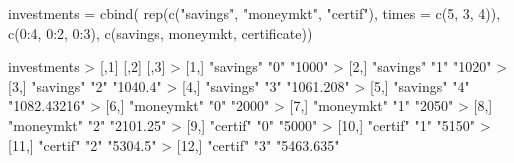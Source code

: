 \documentclass[
]{book}
\newenvironment{Shaded}{\begin{snugshade}}{\end{snugshade}}
\newcommand{\AttributeTok}[1]{\textcolor[rgb]{0.77,0.63,0.00}{#1}}
\newcommand{\DecValTok}[1]{\textcolor[rgb]{0.00,0.00,0.81}{#1}}
\newcommand{\FunctionTok}[1]{\textcolor[rgb]{0.00,0.00,0.00}{#1}}
\newcommand{\NormalTok}[1]{#1}
\newcommand{\OtherTok}[1]{\textcolor[rgb]{0.56,0.35,0.01}{#1}}
\newcommand{\SpecialCharTok}[1]{\textcolor[rgb]{0.00,0.00,0.00}{#1}}
\newcommand{\StringTok}[1]{\textcolor[rgb]{0.31,0.60,0.02}{#1}}
\begin{document}
\begin{Shaded}
\begin{Highlighting}[]
\NormalTok{investments }\OtherTok{=} \FunctionTok{cbind}\NormalTok{(}
  \FunctionTok{rep}\NormalTok{(}\FunctionTok{c}\NormalTok{(}\StringTok{"savings"}\NormalTok{, }\StringTok{"moneymkt"}\NormalTok{, }\StringTok{"certif"}\NormalTok{), }\AttributeTok{times =} \FunctionTok{c}\NormalTok{(}\DecValTok{5}\NormalTok{, }\DecValTok{3}\NormalTok{, }\DecValTok{4}\NormalTok{)),}
  \FunctionTok{c}\NormalTok{(}\DecValTok{0}\SpecialCharTok{:}\DecValTok{4}\NormalTok{, }\DecValTok{0}\SpecialCharTok{:}\DecValTok{2}\NormalTok{, }\DecValTok{0}\SpecialCharTok{:}\DecValTok{3}\NormalTok{), }
  \FunctionTok{c}\NormalTok{(savings, moneymkt, certificate))}

\NormalTok{investments}
\SpecialCharTok{\textgreater{}}\NormalTok{       [,}\DecValTok{1}\NormalTok{]       [,}\DecValTok{2}\NormalTok{] [,}\DecValTok{3}\NormalTok{]        }
\SpecialCharTok{\textgreater{}}\NormalTok{  [}\DecValTok{1}\NormalTok{,] }\StringTok{"savings"}  \StringTok{"0"}  \StringTok{"1000"}      
\SpecialCharTok{\textgreater{}}\NormalTok{  [}\DecValTok{2}\NormalTok{,] }\StringTok{"savings"}  \StringTok{"1"}  \StringTok{"1020"}      
\SpecialCharTok{\textgreater{}}\NormalTok{  [}\DecValTok{3}\NormalTok{,] }\StringTok{"savings"}  \StringTok{"2"}  \StringTok{"1040.4"}    
\SpecialCharTok{\textgreater{}}\NormalTok{  [}\DecValTok{4}\NormalTok{,] }\StringTok{"savings"}  \StringTok{"3"}  \StringTok{"1061.208"}  
\SpecialCharTok{\textgreater{}}\NormalTok{  [}\DecValTok{5}\NormalTok{,] }\StringTok{"savings"}  \StringTok{"4"}  \StringTok{"1082.43216"}
\SpecialCharTok{\textgreater{}}\NormalTok{  [}\DecValTok{6}\NormalTok{,] }\StringTok{"moneymkt"} \StringTok{"0"}  \StringTok{"2000"}      
\SpecialCharTok{\textgreater{}}\NormalTok{  [}\DecValTok{7}\NormalTok{,] }\StringTok{"moneymkt"} \StringTok{"1"}  \StringTok{"2050"}      
\SpecialCharTok{\textgreater{}}\NormalTok{  [}\DecValTok{8}\NormalTok{,] }\StringTok{"moneymkt"} \StringTok{"2"}  \StringTok{"2101.25"}   
\SpecialCharTok{\textgreater{}}\NormalTok{  [}\DecValTok{9}\NormalTok{,] }\StringTok{"certif"}   \StringTok{"0"}  \StringTok{"5000"}      
\SpecialCharTok{\textgreater{}}\NormalTok{ [}\DecValTok{10}\NormalTok{,] }\StringTok{"certif"}   \StringTok{"1"}  \StringTok{"5150"}      
\SpecialCharTok{\textgreater{}}\NormalTok{ [}\DecValTok{11}\NormalTok{,] }\StringTok{"certif"}   \StringTok{"2"}  \StringTok{"5304.5"}    
\SpecialCharTok{\textgreater{}}\NormalTok{ [}\DecValTok{12}\NormalTok{,] }\StringTok{"certif"}   \StringTok{"3"}  \StringTok{"5463.635"}
\end{Highlighting}
\end{Shaded}
\end{document}
